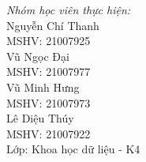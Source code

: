 \documentclass[14pt, a4paper]{article}
\theoremstyle{sltheorem}
\theoremstyle{soltheorem}
\begin{document}
\begin{titlepage}
        \begin{minipage}{0.4\textwidth}
        \begin{flushleft} \large
        \emph{Nhóm học viên thực hiện:}\\
        Nguyễn Chí Thanh \\
        MSHV: 21007925 \\ %
        Vũ Ngọc Đại \\
        MSHV: 21007977 \\
        Vũ Minh Hưng \\
        MSHV: 21007973 \\
        Lê Diệu Thúy \\
        MSHV: 21007922 \\
        Lớp: Khoa học dữ liệu - K4
        \end{flushleft}
        \end{minipage}








        \vfill %

    \end{titlepage}

    \nocite{*}
\end{document}
